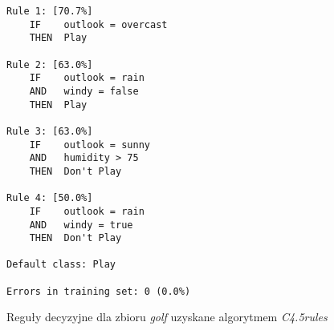 \begin{figure}
\begin{verbatim}
Rule 1: [70.7%]
    IF    outlook = overcast
    THEN  Play

Rule 2: [63.0%]
    IF    outlook = rain
    AND   windy = false
    THEN  Play

Rule 3: [63.0%]
    IF    outlook = sunny
    AND   humidity > 75
    THEN  Don't Play

Rule 4: [50.0%]
    IF    outlook = rain
    AND   windy = true
    THEN  Don't Play

Default class: Play

Errors in training set: 0 (0.0%)
\end{verbatim}
\caption{Reguły decyzyjne dla zbioru \emph{golf} uzyskane algorytmem \emph{C4.5rules}}
\label{p2t1-rules}
\end{figure}
